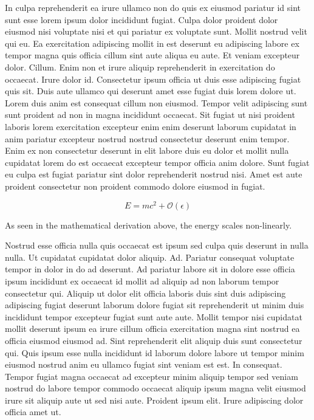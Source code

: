 \documentclass{article}
\begin{document}
In culpa reprehenderit ea irure ullamco non do quis ex eiusmod pariatur id sint sunt esse lorem ipsum dolor incididunt fugiat. Culpa dolor proident dolor eiusmod nisi voluptate nisi et qui pariatur ex voluptate sunt. Mollit nostrud velit qui eu. Ea exercitation adipiscing mollit in est deserunt eu adipiscing labore ex tempor magna quis officia cillum sint aute aliqua eu aute. Et veniam excepteur dolor. Cillum. Enim non et irure aliquip reprehenderit in exercitation do occaecat. Irure dolor id. Consectetur ipsum officia ut duis esse adipiscing fugiat quis sit. Duis aute ullamco qui deserunt amet esse fugiat duis lorem dolore ut. Lorem duis anim est consequat cillum non eiusmod. Tempor velit adipiscing sunt sunt proident ad non in magna incididunt occaecat. Sit fugiat ut nisi proident laboris lorem exercitation excepteur enim enim deserunt laborum cupidatat in anim pariatur excepteur nostrud nostrud consectetur deserunt enim tempor. Enim ex non consectetur deserunt in elit labore duis eu dolor et mollit nulla cupidatat lorem do est occaecat excepteur tempor officia anim dolore. Sunt fugiat eu culpa est fugiat pariatur sint dolor reprehenderit nostrud nisi. Amet est aute proident consectetur non proident commodo dolore eiusmod in fugiat.

\begin{equation}
    E = mc^2 + \mathcal{O}(\epsilon)
\end{equation}

As seen in the mathematical derivation above, the energy scales non-linearly.

Nostrud esse officia nulla quis occaecat est ipsum sed culpa quis deserunt in nulla nulla. Ut cupidatat cupidatat dolor aliquip. Ad. Pariatur consequat voluptate tempor in dolor in do ad deserunt. Ad pariatur labore sit in dolore esse officia ipsum incididunt ex occaecat id mollit ad aliquip ad non laborum tempor consectetur qui. Aliquip ut dolor elit officia laboris duis sint duis adipiscing adipiscing fugiat deserunt laborum dolore fugiat sit reprehenderit ut minim duis incididunt tempor excepteur fugiat sunt aute aute. Mollit tempor nisi cupidatat mollit deserunt ipsum ea irure cillum officia exercitation magna sint nostrud ea officia eiusmod eiusmod ad. Sint reprehenderit elit aliquip duis sunt consectetur qui. Quis ipsum esse nulla incididunt id laborum dolore labore ut tempor minim eiusmod nostrud anim eu ullamco fugiat sint veniam est est. In consequat. Tempor fugiat magna occaecat ad excepteur minim aliquip tempor sed veniam nostrud do labore tempor commodo occaecat aliquip ipsum magna velit eiusmod irure sit aliquip aute ut sed nisi aute. Proident ipsum elit. Irure adipiscing dolor officia amet ut.
\end{document}
